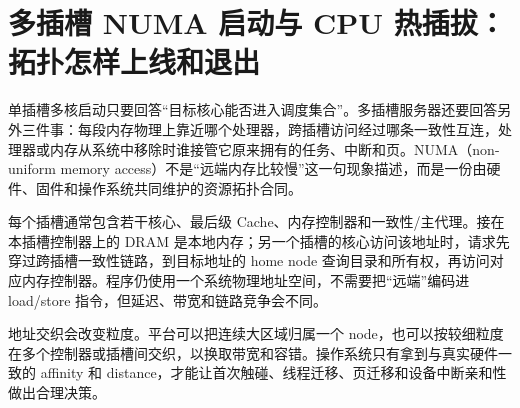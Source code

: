 \section{多插槽 NUMA 启动与 CPU 热插拔：拓扑怎样上线和退出}

单插槽多核启动只要回答“目标核心能否进入调度集合”。多插槽服务器还要回答另外三件事：每段内存物理上靠近哪个处理器，跨插槽访问经过哪条一致性互连，处理器或内存从系统中移除时谁接管它原来拥有的任务、中断和页。NUMA（non-uniform memory access）不是“远端内存比较慢”这一句现象描述，而是一份由硬件、固件和操作系统共同维护的资源拓扑合同。


每个插槽通常包含若干核心、最后级 Cache、内存控制器和一致性/主代理。接在本插槽控制器上的 DRAM 是本地内存；另一个插槽的核心访问该地址时，请求先穿过跨插槽一致性链路，到目标地址的 home node 查询目录和所有权，再访问对应内存控制器。程序仍使用一个系统物理地址空间，不需要把“远端”编码进 load/store 指令，但延迟、带宽和链路竞争会不同。

地址交织会改变粒度。平台可以把连续大区域归属一个 node，也可以按较细粒度在多个控制器或插槽间交织，以换取带宽和容错。操作系统只有拿到与真实硬件一致的 affinity 和 distance，才能让首次触碰、线程迁移、页迁移和设备中断亲和性做出合理决策。

